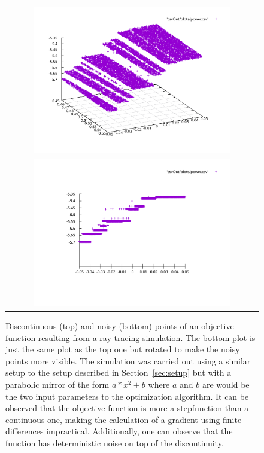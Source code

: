 \documentclass[a4paper,10pt]{article}
\newcommand{\secref}[1]{Section~\ref{#1}}
\begin{document}
    \begin{figure}
        \centering
        \begin{tabular}{c}
        \includegraphics[width=0.8\textwidth]{images/discontinuity.pdf} \\
        \includegraphics[width=0.8\textwidth]{images/noisyness.pdf}
        \end{tabular}
        \caption[Discontinuity and noisiness of the objective function]{
            Discontinuous (top) and noisy (bottom) points of an objective function
            resulting from a ray tracing simulation.
            The bottom plot is just the same plot as the top one but rotated
            to make the noisy points more visible.
            The simulation was carried out using a similar setup to the setup described
            in \secref{sec:setup} but with a parabolic mirror of the form
            $a*x^2 + b$ where $a$ and $b$ are would be the two input
            parameters to the optimization algorithm.
            It can be observed that the objective function is more a stepfunction than
            a continuous one, making the calculation of a gradient using
            finite differences impractical.
            Additionally, one can observe that the function has deterministic noise 
            on top of the discontinuity.
        }
        \label{fig:opt_discontinuous}
    \end{figure}
\end{document}
